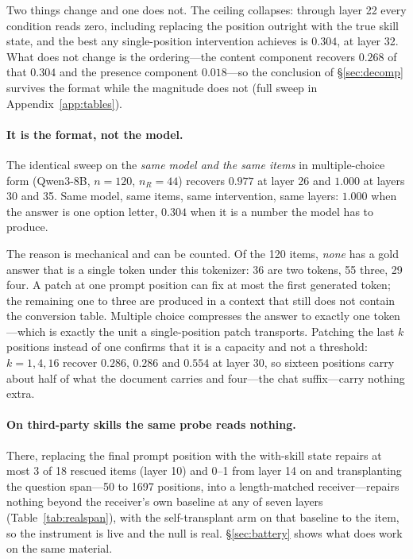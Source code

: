 \documentclass{article}
\begin{document}
Two things change and one does not. The ceiling collapses: through layer 22
every condition reads zero, including replacing the position outright with the
true skill state, and the best any single-position intervention achieves is
$0.304$, at layer 32. What does not change is the ordering---the content
component recovers $0.268$ of that $0.304$ and the presence component
$0.018$---so the conclusion of \S\ref{sec:decomp} survives the format while the
magnitude does not (full sweep in Appendix~\ref{app:tables}).

\paragraph{It is the format, not the model.} The identical sweep on the
\emph{same model and the same items} in multiple-choice form (Qwen3-8B,
$n=120$, $n_R=44$) recovers $0.977$ at layer 26 and $1.000$ at layers 30 and 35.
Same model, same items, same intervention, same layers: $1.000$ when the answer
is one option letter, $0.304$ when it is a number the model has to produce.

The reason is mechanical and can be counted. Of the 120 items, \emph{none} has a
gold answer that is a single token under this tokenizer: 36 are two tokens, 55
three, 29 four. A patch at one prompt position can fix at most the first
generated token; the remaining one to three are produced in a context that still
does not contain the conversion table. Multiple choice compresses the answer to
exactly one token---which is exactly the unit a single-position patch
transports. Patching the last $k$ positions instead of one confirms that it is a
capacity and not a threshold: $k = 1, 4, 16$ recover $0.286$, $0.286$ and
$0.554$ at layer 30, so sixteen positions carry about half of what the document
carries and four---the chat suffix---carry nothing extra.

\paragraph{On third-party skills the same probe reads nothing.} There,
replacing the final prompt position with the with-skill state repairs at most 3
of 18 rescued items (layer 10) and 0--1 from layer 14 on and transplanting the question span---50 to 1697 positions, into a
length-matched receiver---repairs nothing beyond the receiver's own baseline at
any of seven layers (Table~\ref{tab:realspan}), with the self-transplant arm on
that baseline to the item, so the instrument is live and the null is real.
\S\ref{sec:battery} shows what does work on the same material.
\end{document}
